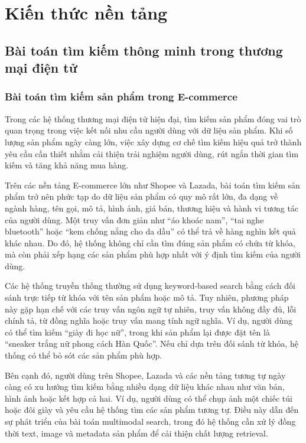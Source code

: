 % 
\section{Kiến thức nền tảng}
\subsection{Bài toán tìm kiếm thông minh trong thương mại điện tử}
\subsubsection{Bài toán tìm kiếm sản phẩm trong E-commerce}

Trong các hệ thống thương mại điện tử hiện đại, tìm kiếm sản phẩm đóng vai trò quan trọng trong việc kết nối nhu cầu người dùng với dữ liệu sản phẩm. Khi số lượng sản phẩm ngày càng lớn, việc xây dựng cơ chế tìm kiếm hiệu quả trở thành yêu cầu cần thiết nhằm cải thiện trải nghiệm người dùng, rút ngắn thời gian tìm kiếm và tăng khả năng mua hàng.

Trên các nền tảng E-commerce lớn như Shopee và Lazada, bài toán tìm kiếm sản phẩm trở nên phức tạp do dữ liệu sản phẩm có quy mô rất lớn, đa dạng về ngành hàng, tên gọi, mô tả, hình ảnh, giá bán, thương hiệu và hành vi tương tác của người dùng. Một truy vấn đơn giản như ``áo khoác nam'', ``tai nghe bluetooth'' hoặc ``kem chống nắng cho da dầu'' có thể trả về hàng nghìn kết quả khác nhau. Do đó, hệ thống không chỉ cần tìm đúng sản phẩm có chứa từ khóa, mà còn phải xếp hạng các sản phẩm phù hợp nhất với ý định tìm kiếm của người dùng.

Các hệ thống truyền thống thường sử dụng keyword-based search bằng cách đối sánh trực tiếp từ khóa với tên sản phẩm hoặc mô tả. Tuy nhiên, phương pháp này gặp hạn chế với các truy vấn ngôn ngữ tự nhiên, truy vấn không đầy đủ, lỗi chính tả, từ đồng nghĩa hoặc truy vấn mang tính ngữ nghĩa. Ví dụ, người dùng có thể tìm kiếm ``giày đi học nữ'', trong khi sản phẩm lại được đặt tên là ``sneaker trắng nữ phong cách Hàn Quốc''. Nếu chỉ dựa trên đối sánh từ khóa, hệ thống có thể bỏ sót các sản phẩm phù hợp.

Bên cạnh đó, người dùng trên Shopee, Lazada và các nền tảng tương tự ngày càng có xu hướng tìm kiếm bằng nhiều dạng dữ liệu khác nhau như văn bản, hình ảnh hoặc kết hợp cả hai. Ví dụ, người dùng có thể chụp ảnh một chiếc túi hoặc đôi giày và yêu cầu hệ thống tìm các sản phẩm tương tự. Điều này dẫn đến sự phát triển của bài toán multimodal search, trong đó hệ thống cần xử lý đồng thời text, image và metadata sản phẩm để cải thiện chất lượng retrieval.

